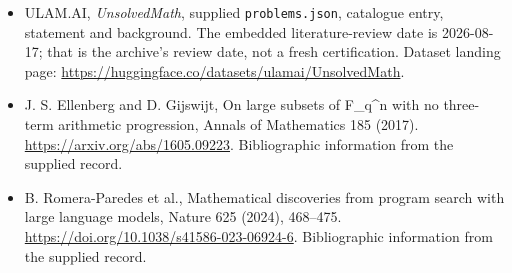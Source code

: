 \documentclass[11pt,a4paper]{article}
\begin{document}
{\small

\begin{itemize}

\item[\hypertarget{source:statement:1}{S1}] ULAM.AI, \emph{UnsolvedMath}, supplied \texttt{problems.json}, catalogue entry, statement and background. The embedded literature-review date is 2026-08-17; that is the archive’s review date, not a fresh certification. Dataset landing page: \url{https://huggingface.co/datasets/ulamai/UnsolvedMath}.

\item[\hypertarget{source:statement:2}{S2}] J. S. Ellenberg and D. Gijswijt, On large subsets of F\_q\textasciicircum{}n with no three-term arithmetic progression, Annals of Mathematics 185 (2017). \url{https://arxiv.org/abs/1605.09223}. Bibliographic information from the supplied record.

\item[\hypertarget{source:statement:3}{S3}] B. Romera-Paredes et al., Mathematical discoveries from program search with large language models, Nature 625 (2024), 468–475. \url{https://doi.org/10.1038/s41586-023-06924-6}. Bibliographic information from the supplied record.

\end{itemize}

}

\label{end:statement}
\end{document}
